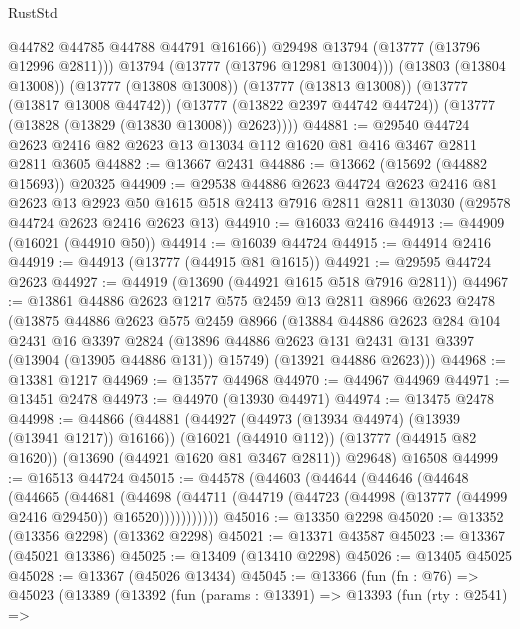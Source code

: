 \begin{lexlean}{RustStd}
\begin{coremodule}
                @44782
                @44785
                @44788
                @44791
                @16166))
            @29498
            @13794
            (@13777 (@13796 @12996 @2811)))
          @13794
          (@13777 (@13796 @12981 @13004)))
        (@13803 (@13804 @13008))
        (@13777 (@13808 @13008))
        (@13777 (@13813 @13008))
        (@13777 (@13817 @13008 @44742))
        (@13777 (@13822 @2397 @44742 @44724))
        (@13777 (@13828 (@13829 (@13830 @13008)) @2623))))
@44881 := @29540 @44724 @2623 @2416 @82 @2623 @13 @13034 @112 @1620 @81 @416 @3467 @2811 @2811 @3605
@44882 := @13667 @2431
@44886 := @13662 (@15692 (@44882 @15693)) @20325
@44909 := @29538
    @44886
    @2623
    @44724
    @2623
    @2416
    @81
    @2623
    @13
    @2923
    @50
    @1615
    @518
    @2413
    @7916
    @2811
    @2811
    @13030
    (@29578 @44724 @2623 @2416 @2623 @13)
@44910 := @16033 @2416
@44913 := @44909 (@16021 (@44910 @50))
@44914 := @16039 @44724
@44915 := @44914 @2416
@44919 := @44913 (@13777 (@44915 @81 @1615))
@44921 := @29595 @44724 @2623
@44927 := @44919 (@13690 (@44921 @1615 @518 @7916 @2811))
@44967 := @13861
    @44886
    @2623
    @1217
    @575
    @2459
    @13
    @2811
    @8966
    @2623
    @2478
    (@13875
      @44886
      @2623
      @575
      @2459
      @8966
      (@13884
        @44886
        @2623
        @284
        @104
        @2431
        @16
        @3397
        @2824
        (@13896 @44886 @2623 @131 @2431 @131 @3397 (@13904 (@13905 @44886 @131)) @15749)
        (@13921 @44886 @2623)))
@44968 := @13381 @1217
@44969 := @13577 @44968
@44970 := @44967 @44969
@44971 := @13451 @2478
@44973 := @44970 (@13930 @44971)
@44974 := @13475 @2478
@44998 := @44866
    (@44881
      (@44927 (@44973 (@13934 @44974) (@13939 (@13941 @1217)) @16166))
      (@16021 (@44910 @112))
      (@13777 (@44915 @82 @1620))
      (@13690 (@44921 @1620 @81 @3467 @2811))
      @29648)
    @16508
@44999 := @16513 @44724
@45015 := @44578
    (@44603
      (@44644
        (@44646
          (@44648
            (@44665
              (@44681
                (@44698
                  (@44711 (@44719 (@44723 (@44998 (@13777 (@44999 @2416 @29450)) @16520)))))))))))
@45016 := @13350 @2298
@45020 := @13352 (@13356 @2298) (@13362 @2298)
@45021 := @13371 @43587
@45023 := @13367 (@45021 @13386)
@45025 := @13409 (@13410 @2298)
@45026 := @13405 @45025
@45028 := @13367 (@45026 @13434)
@45045 := @13366
    (fun (fn : @76) =>
    @45023
      (@13389
        (@13392
          (fun (params : @13391) =>
          @13393
            (fun (rty : @2541) =>

\end{coremodule}
\end{lexlean}
